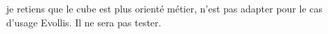 je retiens que le cube est plus orienté métier, n'est pas adapter pour le cas d'usage Evollis.
Il ne sera pas tester.
